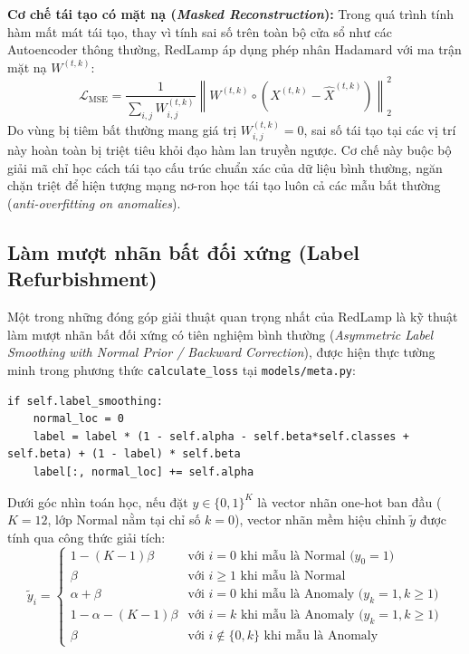 \documentclass[sigconf,nonacm]{acmart}
\begin{document}
\textbf{Cơ chế tái tạo có mặt nạ (\textit{Masked Reconstruction}):}
Trong quá trình tính hàm mất mát tái tạo, thay vì tính sai số trên toàn bộ cửa sổ như các Autoencoder thông thường, RedLamp áp dụng phép nhân Hadamard với ma trận mặt nạ $W^{(t,k)}$:
\begin{equation}
    \mathcal{L}_{\text{MSE}} = \frac{1}{\sum_{i,j} W_{i,j}^{(t,k)}} \left\| W^{(t,k)} \circ \left(X^{(t,k)} - \hat{X}^{(t,k)}\right) \right\|_2^2
\end{equation}
Do vùng bị tiêm bất thường mang giá trị $W_{i,j}^{(t,k)} = 0$, sai số tái tạo tại các vị trí này hoàn toàn bị triệt tiêu khỏi đạo hàm lan truyền ngược. Cơ chế này buộc bộ giải mã chỉ học cách tái tạo cấu trúc chuẩn xác của dữ liệu bình thường, ngăn chặn triệt để hiện tượng mạng nơ-ron học tái tạo luôn cả các mẫu bất thường (\textit{anti-overfitting on anomalies}).

\subsection{Làm mượt nhãn bất đối xứng (Label Refurbishment)}

Một trong những đóng góp giải thuật quan trọng nhất của RedLamp là kỹ thuật làm mượt nhãn bất đối xứng có tiên nghiệm bình thường (\textit{Asymmetric Label Smoothing with Normal Prior / Backward Correction}), được hiện thực tường minh trong phương thức \texttt{calculate\_loss} tại \texttt{models/meta.py}:
\begin{lstlisting}
if self.label_smoothing:
    normal_loc = 0
    label = label * (1 - self.alpha - self.beta*self.classes + self.beta) + (1 - label) * self.beta
    label[:, normal_loc] += self.alpha
\end{lstlisting}

Dưới góc nhìn toán học, nếu đặt $y \in \{0, 1\}^K$ là vector nhãn one-hot ban đầu ($K=12$, lớp Normal nằm tại chỉ số $k=0$), vector nhãn mềm hiệu chỉnh $\tilde{y}$ được tính qua công thức giải tích:
\begin{equation}
    \tilde{y}_i = \begin{cases}
    1 - (K - 1)\beta & \text{với } i = 0 \text{ khi mẫu là Normal ($y_0 = 1$)} \\
    \beta & \text{với } i \ge 1 \text{ khi mẫu là Normal} \\
    \alpha + \beta & \text{với } i = 0 \text{ khi mẫu là Anomaly ($y_k = 1, k \ge 1$)} \\
    1 - \alpha - (K - 1)\beta & \text{với } i = k \text{ khi mẫu là Anomaly ($y_k = 1, k \ge 1$)} \\
    \beta & \text{với } i \notin \{0, k\} \text{ khi mẫu là Anomaly}
    \end{cases}
\end{equation}
\end{document}
